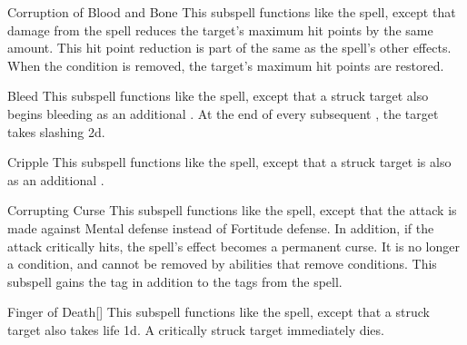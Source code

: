 \begin{ability}[\nth{3}]{Corruption of Blood and Bone}
This subspell functions like the  spell, except that damage from the spell reduces the target's maximum hit points by the same amount.
This hit point reduction is part of the same  as the spell's other effects.
When the condition is removed, the target's maximum hit points are restored.
\end{ability}
\vspace{0.25em}


\begin{ability}[\nth{4}]{Bleed}
This subspell functions like the  spell, except that a struck target also begins bleeding as an additional .
At the end of every subsequent , the target takes slashing  \minus2d.
\end{ability}
\vspace{0.25em}


\begin{ability}[\nth{5}]{Cripple}
This subspell functions like the  spell, except that a struck target is also  as an additional .
\end{ability}
\vspace{0.25em}


\begin{ability}[\nth{6}]{Corrupting Curse}
This subspell functions like the  spell, except that the attack is made against Mental defense instead of Fortitude defense.
In addition, if the attack critically hits, the spell's effect becomes a permanent curse.
It is no longer a condition, and cannot be removed by abilities that remove conditions.
This subspell gains the  tag in addition to the tags from the  spell.
\end{ability}
\vspace{0.25em}


\begin{ability}[\nth{7}]{Finger of Death}[]
This subspell functions like the  spell, except that a struck target also takes life  \plus1d.
A critically struck target immediately dies.
\end{ability}
\vspace{0.25em}

